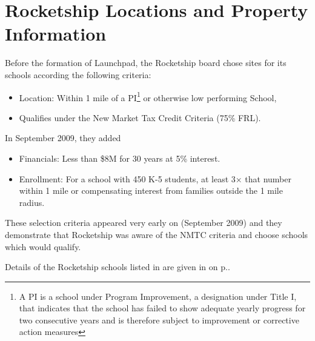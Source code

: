\section{Rocketship Locations and Property Information}
\label{sec:location-and-property-info}\indent%

Before the formation of Launchpad, the Rocketship board chose sites for its schools according the following criteria:
\begin{itemize}
  \item Location: Within 1 mile of a PI\footnote{A PI is a school under Program Improvement, a designation under Title I, that indicates that the school has failed to show adequate yearly progress for two consecutive years and is therefore subject to improvement or corrective action measures} or otherwise low performing School, 
  \item Qualifies under the New Market Tax Credit Criteria (75\% FRL).
\end{itemize}
In September 2009, they added
\begin{itemize}
  \item Financials: Less than \$8M for 30 years at 5\% interest.
  \item Enrollment: For a school with 450 K-5 students, at least 3× that number within 1 mile or compensating interest from families outside the 1 mile radius.
\end{itemize}
These selection criteria appeared very early on (September 2009)\parencite{RSED2009b} and they demonstrate that Rocketship was aware of the NMTC criteria and choose schools which would qualify.

Details of the Rocketship schools listed in  are given in  on
p.\pageref{appx:rocketship-property-info}.

